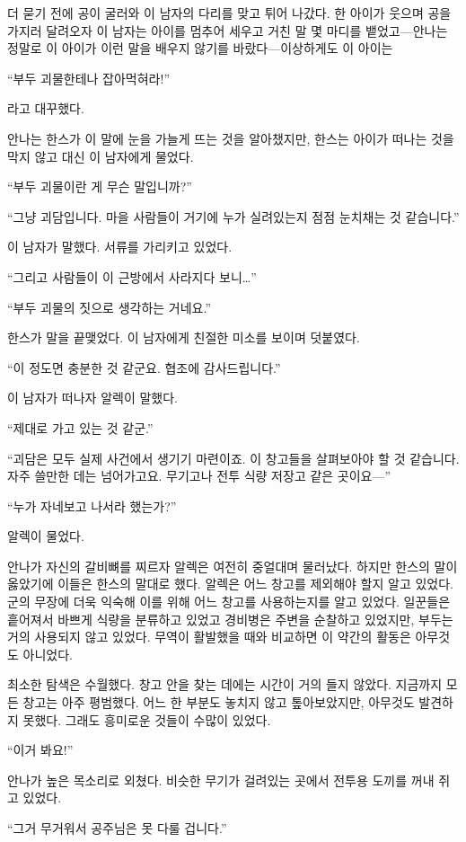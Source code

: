 더 묻기 전에 공이 굴러와 이 남자의 다리를 맞고 튀어 나갔다. 한 아이가 웃으며 공을 가지러 달려오자 이 남자는 아이를 멈추어 세우고 거친 말 몇 마디를 뱉었고—안나는 정말로 이 아이가 이런 말을 배우지 않기를 바랐다—이상하게도 이 아이는

``부두 괴물한테나 잡아먹혀라!''

라고 대꾸했다.

안나는 한스가 이 말에 눈을 가늘게 뜨는 것을 알아챘지만, 한스는 아이가 떠나는 것을 막지 않고 대신 이 남자에게 물었다.

``부두 괴물이란 게 무슨 말입니까?''

``그냥 괴담입니다. 마을 사람들이 거기에 누가 실려있는지 점점 눈치채는 것 같습니다.''

이 남자가 말했다. 서류를 가리키고 있었다.

``그리고 사람들이 이 근방에서 사라지다 보니\ldots''

``부두 괴물의 짓으로 생각하는 거네요.''

한스가 말을 끝맺었다. 이 남자에게 친절한 미소를 보이며 덧붙였다.

``이 정도면 충분한 것 같군요. 협조에 감사드립니다.''

이 남자가 떠나자 알렉이 말했다.

``제대로 가고 있는 것 같군.''

``괴담은 모두 실제 사건에서 생기기 마련이죠. 이 창고들을 살펴보아야 할 것 같습니다. 자주 쓸만한 데는 넘어가고요. 무기고나 전투 식량 저장고 같은 곳이요—''

``누가 자네보고 나서라 했는가?''

알렉이 물었다.

안나가 자신의 갈비뼈를 찌르자 알렉은 여전히 중얼대며 물러났다. 하지만 한스의 말이 옳았기에 이들은 한스의 말대로 했다. 알렉은 어느 창고를 제외해야 할지 알고 있었다. 군의 무장에 더욱 익숙해 이를 위해 어느 창고를 사용하는지를 알고 있었다. 일꾼들은 흩어져서 바쁘게 식량을 분류하고 있었고 경비병은 주변을 순찰하고 있었지만, 부두는 거의 사용되지 않고 있었다. 무역이 활발했을 때와 비교하면 이 약간의 활동은 아무것도 아니었다.

최소한 탐색은 수월했다. 창고 안을 찾는 데에는 시간이 거의 들지 않았다. 지금까지 모든 창고는 아주 평범했다. 어느 한 부분도 놓치지 않고 톺아보았지만, 아무것도 발견하지 못했다. 그래도 흥미로운 것들이 수많이 있었다.

``이거 봐요!''

안나가 높은 목소리로 외쳤다. 비슷한 무기가 걸려있는 곳에서 전투용 도끼를 꺼내 쥐고 있었다.

``그거 무거워서 공주님은 못 다룰 겁니다.''

